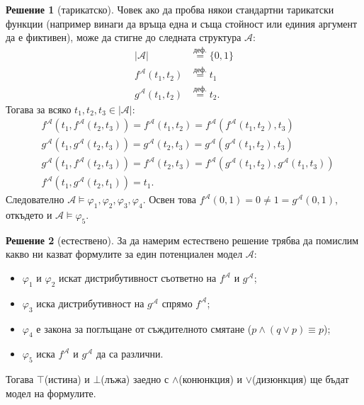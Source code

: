 \documentclass[12pt]{article}
\newcommand{\calA}{\mathcal{A}}
\theoremstyle{definition}
\newtheorem*{solution}{Решение}
\begin{document}
\begin{solution}[тарикатско]
Човек ако да пробва някои стандартни тарикатски функции (например винаги да връща една и съща стойност или единия аргумент да е фиктивен), може да стигне до следната структура $\calA$:
\begin{align*}
  |\calA| & \stackrel{\text{деф.}}{=} \{ 0, 1 \}       \\
  f^\calA(t_1, t_2) & \stackrel{\text{деф.}}{=} t_1    \\
  g^\calA(t_1, t_2) & \stackrel{\text{деф.}}{=} t_2.
\end{align*}
Тогава за всяко $t_1, t_2, t_3 \in |\calA|$:
\begin{align*}
  & f^\calA(t_1, f^\calA(t_2, t_3)) = f^\calA(t_1, t_2) = f^\calA(f^\calA(t_1, t_2), t_3)               \\
  & g^\calA(t_1, g^\calA(t_2, t_3)) = g^\calA(t_2, t_3) = g^\calA(g^\calA(t_1, t_2), t_3)               \\
  & g^\calA(t_1, f^\calA(t_2, t_3)) = f^\calA(t_2, t_3) = f^\calA(g^\calA(t_1, t_2), g^\calA(t_1, t_3)) \\
  & f^\calA(t_1, g^\calA(t_2, t_1)) = t_1.
\end{align*}
Следователно $\calA \models \varphi_1, \varphi_2, \varphi_3, \varphi_4$.
Освен това $f^\calA(0, 1) = 0 \neq 1 = g^\calA(0, 1)$, откъдето и $\calA \models \varphi_5$.
\end{solution}

\begin{solution}[естествено]
За да намерим естествено решение трябва да помислим какво ни казват формулите за един потенциален модел $\calA$:
\begin{itemize}
  \item $\varphi_1$ и $\varphi_2$ искат дистрибутивност съответно на $f^\calA$ и $g^\calA$;
  \item $\varphi_3$ иска дистрибутивност на $g^\calA$ спрямо $f^\calA$;
  \item $\varphi_4$ е закона за поглъщане от съждителното смятане ($p \land (q \lor p) \equiv p$);
  \item $\varphi_5$ иска $f^\calA$ и $g^\calA$ да са различни.
\end{itemize}
Тогава $\top$(истина) и $\bot$(лъжа) заедно с $\land$(конюнкция) и $\lor$(дизюнкция) ще бъдат модел на формулите.
\end{solution}
\end{document}
